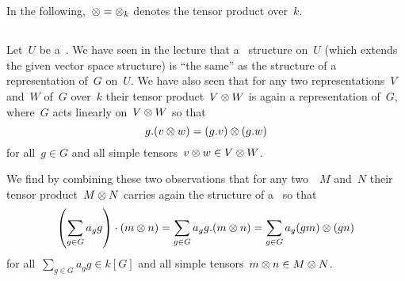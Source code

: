 \section{}

In the following,~${\otimes} = {\otimes_k}$ denotes the tensor product over~$k$.





\subsection{}

Let~$U$ be a~{\kvs}.
We have seen in the lecture that a~{} structure on~$U$ (which extends the given vector space structure) is \enquote{the same} as the structure of a representation of~$G$ on~$U$.
We have also seen that for any two representations~$V$ and~$W$ of~$G$ over~$k$ their tensor product~$V \otimes W$ is again a representation of~$G$, where~$G$ acts linearly on~$V \otimes W$ so that
\[
    g.(v \otimes w)
  = (g.v) \otimes (g.w)
\]
for all~$g \in G$ and all simple tensors~$v \otimes w \in V \otimes W$.

We find by combining these two observations that for any two~{}~$M$ and~$N$ their tensor product~$M \otimes N$ carries again the structure of a~{} so that
\begin{equation}
  \label{tensor product of kG modules}
    \left( \sum_{g \in G} a_g g \right) \cdot (m \otimes n)
  = \sum_{g \in G} a_g g.(m \otimes n)
  = \sum_{g \in G} a_g (gm) \otimes (gn)
\end{equation}
for all~$\sum_{g \in G} a_g g \in k[G]$ and all simple tensors~$m \otimes n \in M \otimes N$.


